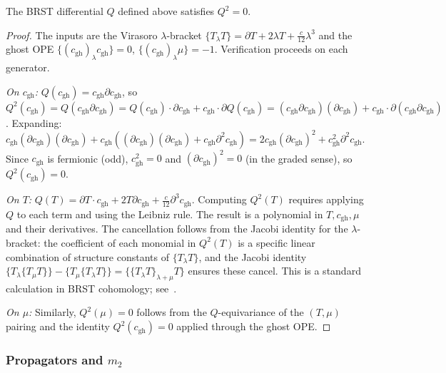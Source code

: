 \begin{lemma}[Nilpotency $Q^2 = 0$]
\label{lem:vir-nilpotent}
The BRST differential $Q$ defined above satisfies $Q^2 = 0$.
\end{lemma}
\begin{proof}
The inputs are the Virasoro $\lambda$-bracket $\{T_\lambda T\} = \partial T + 2\lambda T + \frac{c}{12}\lambda^3$ and the ghost OPE $\{(c_{\mathrm{gh}})_\lambda c_{\mathrm{gh}}\} = 0$, $\{(c_{\mathrm{gh}})_\lambda \mu\} = -1$. Verification proceeds on each generator.

\emph{On $c_{\mathrm{gh}}$:} $Q(c_{\mathrm{gh}}) = c_{\mathrm{gh}}\partial c_{\mathrm{gh}}$, so $Q^2(c_{\mathrm{gh}}) = Q(c_{\mathrm{gh}}\partial c_{\mathrm{gh}}) = Q(c_{\mathrm{gh}})\cdot\partial c_{\mathrm{gh}} + c_{\mathrm{gh}}\cdot\partial Q(c_{\mathrm{gh}}) = (c_{\mathrm{gh}}\partial c_{\mathrm{gh}})(\partial c_{\mathrm{gh}}) + c_{\mathrm{gh}}\cdot\partial(c_{\mathrm{gh}}\partial c_{\mathrm{gh}})$. Expanding: $c_{\mathrm{gh}}(\partial c_{\mathrm{gh}})(\partial c_{\mathrm{gh}}) + c_{\mathrm{gh}}((\partial c_{\mathrm{gh}})(\partial c_{\mathrm{gh}}) + c_{\mathrm{gh}}\partial^2 c_{\mathrm{gh}}) = 2c_{\mathrm{gh}}(\partial c_{\mathrm{gh}})^2 + c_{\mathrm{gh}}^2\partial^2 c_{\mathrm{gh}}$. Since $c_{\mathrm{gh}}$ is fermionic (odd), $c_{\mathrm{gh}}^2 = 0$ and $(\partial c_{\mathrm{gh}})^2 = 0$ (in the graded sense), so $Q^2(c_{\mathrm{gh}}) = 0$.

\emph{On $T$:} $Q(T) = \partial T \cdot c_{\mathrm{gh}} + 2T\partial c_{\mathrm{gh}} + \frac{c}{12}\partial^3 c_{\mathrm{gh}}$. Computing $Q^2(T)$ requires applying $Q$ to each term and using the Leibniz rule. The result is a polynomial in $T, c_{\mathrm{gh}}, \mu$ and their derivatives. The cancellation follows from the Jacobi identity for the $\lambda$-bracket: the coefficient of each monomial in $Q^2(T)$ is a specific linear combination of structure constants of $\{T_\lambda T\}$, and the Jacobi identity $\{T_\lambda \{T_\mu T\}\} - \{T_\mu \{T_\lambda T\}\} = \{\{T_\lambda T\}_{\lambda+\mu} T\}$ ensures these cancel. This is a standard calculation in BRST cohomology; see~\cite{FMS86}.

\emph{On $\mu$:} Similarly, $Q^2(\mu) = 0$ follows from the $Q$-equivariance of the $(T,\mu)$ pairing and the identity $Q^2(c_{\mathrm{gh}}) = 0$ applied through the ghost OPE.
\end{proof}

\subsubsection{Propagators and $m_2$}


